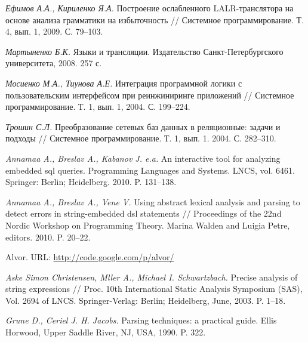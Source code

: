 \documentclass[a5paper]{article}
\begin{document}
\begin{thebibliography}{99}
  
\emph{Ефимов А.А., Кириленко Я.А.} Построение ослабленного LALR-транслятора на основе анализа грамматики на избыточность // Системное программирование. Т. 4, вып. 1, 2009. С. 79--103.  

\emph{Мартыненко Б.К.} Языки и трансляции. Издательство Санкт-Петербургского университета, 2008. 257 с. 

\emph{Мосиенко М.А., Тиунова А.Е.} Интеграция программной логики с пользовательским интерфейсом при реинжиниринге приложений // Системное программирование. Т. 1, вып. 1, 2004. С. 199--224.

\emph{Трошин С.Л.} Преобразование сетевых баз данных в реляционные: задачи и подходы // Системное программирование. Т. 1, вып. 1. 2004. С. 282--310.

\emph{Annamaa A., Breslav A., Kabanov J. e.a.} An interactive tool for analyzing embedded sql queries. Programming Languages and Systems. LNCS, vol. 6461. Springer: Berlin; Heidelberg. 2010. P. 131--138.

\emph{Annamaa A., Breslav A., Vene V.} Using abstract lexical analysis and parsing to detect errors in string-embedded dsl statements // Proceedings of the 22nd Nordic Workshop on Programming Theory. Marina Walden and Luigia Petre, editors. 2010. P. 20--22.

Alvor. URL:  \href{http://code.google.com/p/alvor/}{http://code.google.com/p/alvor/}

\emph{Aske Simon Christensen, Mller A., Michael I. Schwartzbach.} Precise analysis of string expressions // Proc. 10th International Static Analysis Symposium (SAS), Vol. 2694 of LNCS. Springer-Verlag: Berlin; Heidelberg, June, 2003. P. 1--18.

\emph{Grune D., Ceriel J. H. Jacobs.} Parsing techniques: a practical guide. Ellis Horwood, Upper Saddle River, NJ, USA, 1990. P. 322.


\end{thebibliography}
\end{document}
